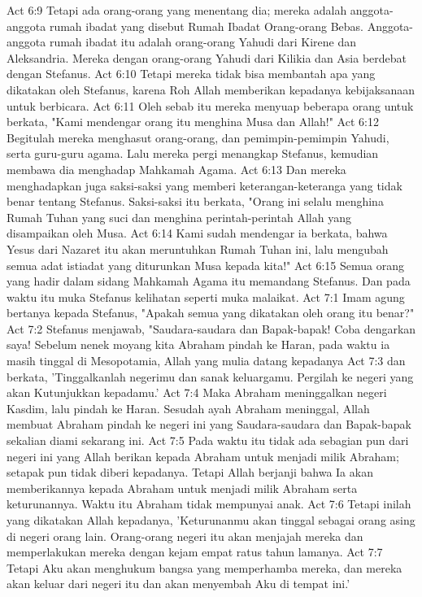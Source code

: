 Act 6:9  Tetapi ada orang-orang yang menentang dia; mereka adalah anggota-anggota rumah ibadat yang disebut Rumah Ibadat Orang-orang Bebas. Anggota-anggota rumah ibadat itu adalah orang-orang Yahudi dari Kirene dan Aleksandria. Mereka dengan orang-orang Yahudi dari Kilikia dan Asia berdebat dengan Stefanus.
Act 6:10  Tetapi mereka tidak bisa membantah apa yang dikatakan oleh Stefanus, karena Roh Allah memberikan kepadanya kebijaksanaan untuk berbicara.
Act 6:11  Oleh sebab itu mereka menyuap beberapa orang untuk berkata, "Kami mendengar orang itu menghina Musa dan Allah!"
Act 6:12  Begitulah mereka menghasut orang-orang, dan pemimpin-pemimpin Yahudi, serta guru-guru agama. Lalu mereka pergi menangkap Stefanus, kemudian membawa dia menghadap Mahkamah Agama.
Act 6:13  Dan mereka menghadapkan juga saksi-saksi yang memberi keterangan-keteranga yang tidak benar tentang Stefanus. Saksi-saksi itu berkata, "Orang ini selalu menghina Rumah Tuhan yang suci dan menghina perintah-perintah Allah yang disampaikan oleh Musa.
Act 6:14  Kami sudah mendengar ia berkata, bahwa Yesus dari Nazaret itu akan meruntuhkan Rumah Tuhan ini, lalu mengubah semua adat istiadat yang diturunkan Musa kepada kita!"
Act 6:15  Semua orang yang hadir dalam sidang Mahkamah Agama itu memandang Stefanus. Dan pada waktu itu muka Stefanus kelihatan seperti muka malaikat.
Act 7:1  Imam agung bertanya kepada Stefanus, "Apakah semua yang dikatakan oleh orang itu benar?"
Act 7:2  Stefanus menjawab, "Saudara-saudara dan Bapak-bapak! Coba dengarkan saya! Sebelum nenek moyang kita Abraham pindah ke Haran, pada waktu ia masih tinggal di Mesopotamia, Allah yang mulia datang kepadanya
Act 7:3  dan berkata, 'Tinggalkanlah negerimu dan sanak keluargamu. Pergilah ke negeri yang akan Kutunjukkan kepadamu.'
Act 7:4  Maka Abraham meninggalkan negeri Kasdim, lalu pindah ke Haran. Sesudah ayah Abraham meninggal, Allah membuat Abraham pindah ke negeri ini yang Saudara-saudara dan Bapak-bapak sekalian diami sekarang ini.
Act 7:5  Pada waktu itu tidak ada sebagian pun dari negeri ini yang Allah berikan kepada Abraham untuk menjadi milik Abraham; setapak pun tidak diberi kepadanya. Tetapi Allah berjanji bahwa Ia akan memberikannya kepada Abraham untuk menjadi milik Abraham serta keturunannya. Waktu itu Abraham tidak mempunyai anak.
Act 7:6  Tetapi inilah yang dikatakan Allah kepadanya, 'Keturunanmu akan tinggal sebagai orang asing di negeri orang lain. Orang-orang negeri itu akan menjajah mereka dan memperlakukan mereka dengan kejam empat ratus tahun lamanya.
Act 7:7  Tetapi Aku akan menghukum bangsa yang memperhamba mereka, dan mereka akan keluar dari negeri itu dan akan menyembah Aku di tempat ini.'
